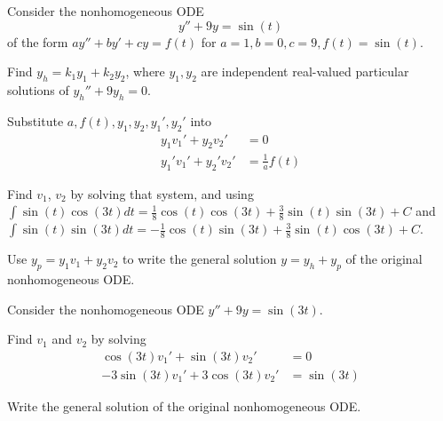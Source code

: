 \begin{applicationActivities}
\begin{activity}{20}
Consider the nonhomogeneous ODE \[y''+9y=\sin(t)\] of the
form \(ay''+by'+cy=f(t)\) for \(a=1,b=0,c=9,f(t)=\sin(t)\).
\vfill
\begin{subactivity}
Find \(y_h=k_1y_1+k_2y_2\), where \(y_1,y_2\) are
independent real-valued particular
solutions of \(y_h''+9y_h=0\).
\end{subactivity}
\begin{subactivity}
Substitute \(a,f(t),y_1,y_2,y_1',y_2'\) into
\begin{alignat*}{2}
y_1 v_1' + y_2 v_2'&=0 \\
y_1' v_1' + y_2' v_2'&=\frac{1}{a}f(t) 
\end{alignat*}
\end{subactivity}
\begin{subactivity}
Find \(v_1\), \(v_2\) by solving that system, and using
\(\int\sin(t)\cos(3t)dt=\frac{1}{8}\cos(t)\cos(3t)+\frac{3}{8}\sin(t)\sin(3t)+C\) and
\(\int\sin(t)\sin(3t)dt=-\frac{1}{8}\cos(t)\sin(3t)+\frac{3}{8}\sin(t)\cos(3t)+C\).
\end{subactivity}
\begin{subactivity}
Use \(y_p=y_1v_1+y_2v_2\) to write the general solution \(y=y_h+y_p\) 
of the original nonhomogeneous ODE.
\end{subactivity}
\end{activity}

\begin{activity}{10}
Consider the nonhomogeneous ODE \(y''+9y=\sin(3t)\).
\vfill
\begin{subactivity}
Find \(v_1\) and \(v_2\) by solving
\begin{alignat*}{2}
\cos(3t) v_1' + \sin(3t) v_2'&=0 \\
-3\sin(3t) v_1' + 3\cos(3t) v_2'&=\sin(3t)
\end{alignat*}
\end{subactivity}
\begin{subactivity}
Write the general solution of the original nonhomogeneous ODE.
\end{subactivity}
\end{activity}

\end{applicationActivities}
